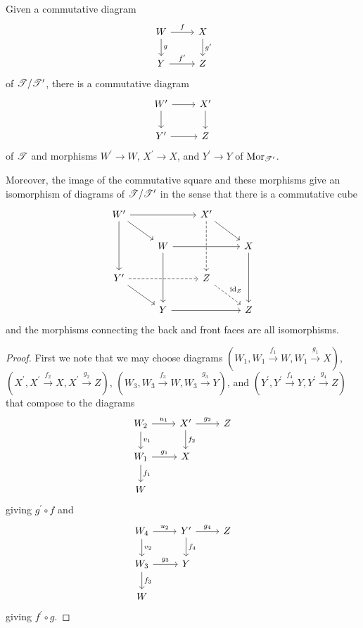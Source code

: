 \documentclass[dissertation.tex]{subfiles}
\begin{document}
\begin{lem}
  Given a commutative diagram
  $$\begin{tikzcd}
    W \arrow{r}{f}\arrow{d}{g} & X\arrow{d}{g^\prime}\\
    Y \arrow{r}{f^\prime} & Z
  \end{tikzcd}$$
  of $\mathscr{T}/\mathscr{T}^\prime$, there is a commutative diagram
  $$\begin{tikzcd}
    W^\prime \arrow{r}\arrow{d} & X^\prime\arrow{d}\\
    Y^\prime \arrow{r} & Z
  \end{tikzcd}$$
  of $\mathscr{T}$ and morphisms $W^\prime \to W$, $X^\prime \to X$, and $Y^\prime \to Y$ of $\operatorname{Mor}_{\mathscr{T}^\prime}$.
  
  Moreover, the image of the commutative square and these morphisms give an isomorphism of diagrams of $\mathscr{T}/\mathscr{T}^\prime$ in the sense that there is a commutative cube
  $$\begin{tikzcd}
    W^\prime\arrow{rr}\arrow{rd}\arrow{dd} & & X^\prime\arrow[dashed]{dd}\arrow{rd}\\
    & W \arrow{rr}\arrow{dd} & & X\arrow{dd}\\
    Y^\prime\arrow[dashed]{rr}\arrow{rd} & & Z\arrow[dashed]{rd}{\id_Z}\\
    & Y\arrow{rr} & & Z
  \end{tikzcd}$$
  and the morphisms connecting the back and front faces are all isomorphisms.
  \begin{proof}
    First we note that we may choose diagrams $(W_1, W_1 \overset{f_1}\to W, W_1 \overset{g_1}\to X)$, $(X^\prime, X^\prime \overset{f_2}\to X, X^\prime \overset{g_2}\to Z)$, $(W_3, W_3 \overset{f_3}\to W, W_3 \overset{g_3}\to Y)$, and $(Y^\prime, Y^\prime \overset{f_4}\to Y, Y^\prime \overset{g_4}\to Z)$
    that compose to the diagrams
    $$\begin{tikzcd}
      W_2 \arrow{r}{u_1}\arrow{d}{v_1} & X^\prime \arrow{r}{g_2}\arrow{d}{f_2} & Z\\
      W_1 \arrow{r}{g_1}\arrow{d}{f_1} & X\\
      W
    \end{tikzcd}$$
    giving $g^\prime \circ f$
    and
    $$\begin{tikzcd}
      W_4 \arrow{r}{u_2}\arrow{d}{v_2} & Y^\prime \arrow{r}{g_4}\arrow{d}{f_4} & Z\\
      W_3 \arrow{r}{g_3}\arrow{d}{f_3} & Y\\
      W
    \end{tikzcd}$$
    giving $f^\prime \circ g$.

\end{proof}
\end{lem}
\end{document}
